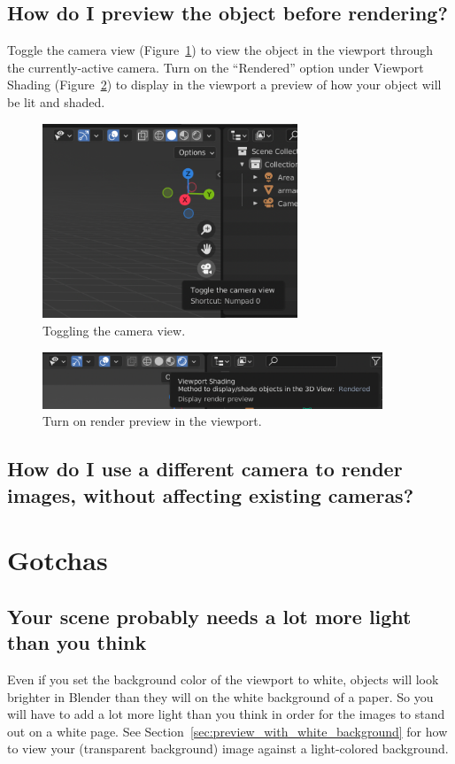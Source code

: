 \documentclass[10pt]{article}
\begin{document}
\subsection{How do I preview the object before rendering?}
\label{sec:FAQ-camera-view}
Toggle the camera view (Figure~\ref{fig:toggle-camera-view}) to view the object in the viewport through the currently-active camera. Turn on the ``Rendered'' option under Viewport Shading (Figure~\ref{fig:rendered-viewport-shading}) to display in the viewport a preview of how your object will be lit and shaded.
\begin{figure}[H]
    \centering
    \includegraphics[width=3in]{images/toggle-camera-view.png}
    \caption{Toggling the camera view.}
    \label{fig:toggle-camera-view}
\end{figure}
\begin{figure}[H]
    \centering
    \includegraphics[width=4in]{images/rendered-viewport-shading.png}
    \caption{Turn on render preview in the viewport.}
    \label{fig:rendered-viewport-shading}
\end{figure}

\subsection{How do I use a different camera to render images, without affecting existing cameras?}


\section{Gotchas}

\subsection{Your scene probably needs a lot more light than you think}
\label{subsec:light_intensity}
Even if you set the background color of the viewport to white, objects will look brighter in Blender than they will on the white background of a paper. So you will have to add a lot more light than you think in order for the images to stand out on a white page. See Section~\ref{sec:preview_with_white_background} for how to view your (transparent background) image against a light-colored background.
\end{document}
